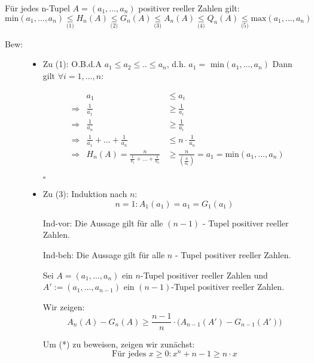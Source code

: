 \documentclass[12pt,a4paper,leqno]{article}
\begin{document}
	Für jedes n-Tupel $A=(a_1,\dotsc, a_n)$ positiver reeller Zahlen gilt:
	$$\textrm{min}(a_1,\dotsc, a_n) \underset{\textrm{(1)}}{\leq} 
	 H_n(A) \underset{\textrm{(2)}}{\leq} 
	 G_n(A) \underset{\textrm{(3)}}{\leq} 
	 A_n(A) \underset{\textrm{(4)}}{\leq} 
	 Q_n(A) \underset{\textrm{(5)}}{\leq} 
	 \textrm{max}(a_1,\dotsc, a_n)$$
	
\begin{description}
\item[Bew:] \hfill

\begin{itemize}

	\item[] Zu (1): O.B.d.A $a_1 \leq a_2 \leq .. \leq a_n$, d.h. $a_1 =$ min$(a_1,\dotsc, a_n)$
	Dann gilt $\forall i = 1,\dotsc, n$:
	
	\begin{align*}
	& &a_1 &\leq a_i \\
	&\Rightarrow &\frac{1}{a_1} &\geq \frac{1}{a_i} \\
 	&\Rightarrow &\frac{1}{a_n} &\geq \frac{1}{a_i} \\
	&\Rightarrow &\frac{1}{a_1} + \ldots + \frac{1}{a_n} &\leq n  \cdot  \frac{1}{a_n} \\
	&\Rightarrow &H_n(A) = \frac{n}{\frac{1}{a_1} + \ldots + \frac{1}{a_n}} &\geq \frac{n}{\left(\frac{n}{a_1}\right)} = a_1 = \textrm{min}(a_1,\dotsc, a_n)
	\end{align*}
	 \begin{flushright}$\square$\end{flushright}

	\item[] Zu (3): Induktion nach $n$:
	$$n = 1: A_1(a_1) = a_1 = G_1(a_1)$$
	
	Ind-vor: Die Aussage gilt für alle $(n-1)$ - Tupel positiver reeller Zahlen.

	Ind-beh: Die Aussage gilt für alle $n$  - Tupel positiver reeller Zahlen.

	Sei $A=(a_1,\dotsc, a_n)$ ein $n$-Tupel positiver reeller Zahlen und\\
	$A' := (a_1,\dotsc, a_{n-1})$ ein $(n-1)$-Tupel positiver reeller Zahlen.


	Wir zeigen:
	\renewcommand{\theequation}{*} 
	\begin{equation}	
	A_n(A) - G_n(A) \geq \frac{n-1}{n}    \cdot  \bigg( A_{n-1}(A') - G_{n-1}(A')\bigg)
	\end{equation}
	
	Um (*) zu beweisen, zeigen wir zunächst:
	\renewcommand{\theequation}{**} 
	\begin{equation}	
		\textrm{Für jedes } x \geq 0 : x ^ n + n - 1 \geq n  \cdot  x
	\end{equation}


\end{itemize}
\end{description}
\end{document}
